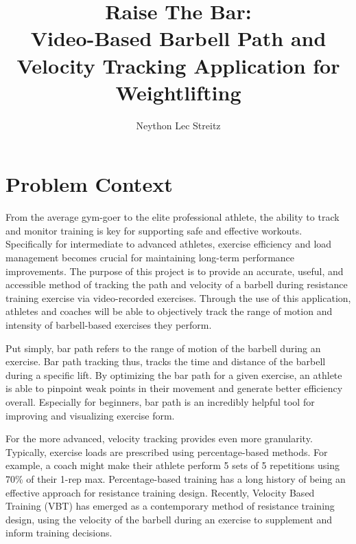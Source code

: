 \documentclass[10pt,twocolumn]{article}
\title{Raise The Bar: \\ Video-Based Barbell Path and Velocity Tracking Application for Weightlifting}
\author{Neython Lec Streitz}
\affiliation{Occidental College}
\begin{document}
\maketitle

\section{Problem Context}
From the average gym-goer to the elite professional athlete, the ability to track and monitor training is key for supporting safe and effective workouts. 
Specifically for intermediate to advanced athletes, exercise efficiency and load management becomes crucial for maintaining long-term performance improvements.
The purpose of this project is to provide an accurate, useful, and accessible method of tracking the path and velocity of a barbell during resistance training exercise via video-recorded exercises.
Through the use of this application, athletes and coaches will be able to objectively track the range of motion and intensity of barbell-based exercises they perform. \par

Put simply, bar path refers to the range of motion of the barbell during an exercise. 
Bar path tracking thus, tracks the time and distance of the barbell during a specific lift. 
By optimizing the bar path for a given exercise, an athlete is able to pinpoint weak points in their movement and generate better efficiency overall. 
Especially for beginners, bar path is an incredibly helpful tool for improving and visualizing exercise form. \par

For the more advanced, velocity tracking provides even more granularity.
Typically, exercise loads are prescribed using percentage-based methods.
For example, a coach might make their athlete perform 5 sets of 5 repetitions using 70\% of their 1-rep max.
Percentage-based training has a long history of being an effective approach for resistance training design.
Recently, Velocity Based Training (VBT) has emerged as a contemporary method of resistance training design, using the velocity of the barbell during an exercise to supplement and inform training decisions. \par
\end{document}
